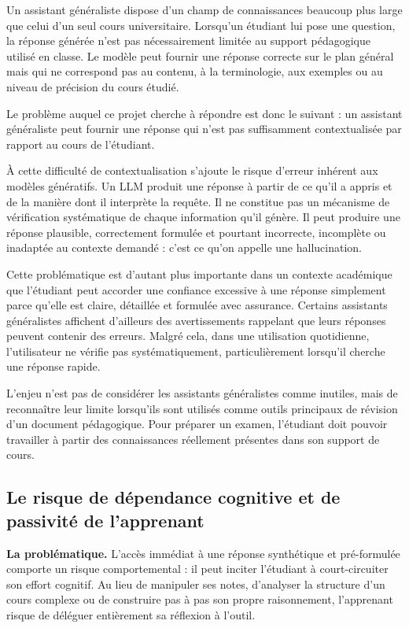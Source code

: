 \documentclass[12pt,a4paper,oneside]{report}
\begin{document}
Un assistant généraliste dispose d'un champ de connaissances beaucoup plus large que celui d'un seul cours universitaire. Lorsqu'un étudiant lui pose une question, la réponse générée n'est pas nécessairement limitée au support pédagogique utilisé en classe. Le modèle peut fournir une réponse correcte sur le plan général mais qui ne correspond pas au contenu, à la terminologie, aux exemples ou au niveau de précision du cours étudié.

Le problème auquel ce projet cherche à répondre est donc le suivant : un assistant généraliste peut fournir une réponse qui n'est pas suffisamment contextualisée par rapport au cours de l'étudiant.

À cette difficulté de contextualisation s'ajoute le risque d'erreur inhérent aux modèles génératifs. Un LLM produit une réponse à partir de ce qu'il a appris et de la manière dont il interprète la requête. Il ne constitue pas un mécanisme de vérification systématique de chaque information qu'il génère. Il peut produire une réponse plausible, correctement formulée et pourtant incorrecte, incomplète ou inadaptée au contexte demandé : c'est ce qu'on appelle une hallucination.

Cette problématique est d'autant plus importante dans un contexte académique que l'étudiant peut accorder une confiance excessive à une réponse simplement parce qu'elle est claire, détaillée et formulée avec assurance. Certains assistants généralistes affichent d'ailleurs des avertissements rappelant que leurs réponses peuvent contenir des erreurs. Malgré cela, dans une utilisation quotidienne, l'utilisateur ne vérifie pas systématiquement, particulièrement lorsqu'il cherche une réponse rapide.

L'enjeu n'est pas de considérer les assistants généralistes comme inutiles, mais de reconnaître leur limite lorsqu'ils sont utilisés comme outils principaux de révision d'un document pédagogique. Pour préparer un examen, l'étudiant doit pouvoir travailler à partir des connaissances réellement présentes dans son support de cours.

\subsection{Le risque de dépendance cognitive et de passivité de l'apprenant}

\textbf{La problématique.} L'accès immédiat à une réponse synthétique et pré-formulée comporte un risque comportemental : il peut inciter l'étudiant à court-circuiter son effort cognitif. Au lieu de manipuler ses notes, d'analyser la structure d'un cours complexe ou de construire pas à pas son propre raisonnement, l'apprenant risque de déléguer entièrement sa réflexion à l'outil.
\end{document}
